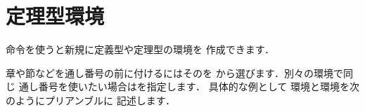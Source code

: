 {{%





\section{定理型環境}

命令を使うと新規に定義型や定理型の環境を
作成できます．
\begin{usage}
\newtheorem{$\<環境名>$}{$\<見出し>$}[$\<親カウンタ>$]
\newtheorem{$\<環境名>$}[$\<同系の環境名>$]{$\<見出し>$}
\end{usage}

章や節などを通し番号の前に付けるにはそのを
から選びます．別々の環境で同じ
通し番号を使いたい場合はを指定します．
具体的な例として 環境と環境を次のようにプリアンブルに
記述します．

}}
